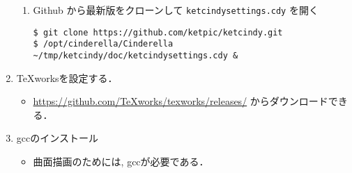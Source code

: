 \documentclass{ujarticle}
\begin{document}
\begin{enumerate}[\bf\large 1.]
\begin{enumerate}[(1)]
\item Github から最新版をクローンして \verb|ketcindysettings.cdy| を開く
\begin{verbatim}
$ git clone https://github.com/ketpic/ketcindy.git
$ /opt/cinderella/Cinderella ~/tmp/ketcindy/doc/ketcindysettings.cdy &
\end{verbatim}

\end{enumerate}


\item TeXworksを設定する．
  \begin{itemize}
  \item \url{https://github.com/TeXworks/texworks/releases/} からダウンロードできる．
  \end{itemize}

\item gccのインストール
  \begin{itemize}
    \item 曲面描画のためには, gccが必要である．
  \end{itemize}
\end{enumerate}
\end{document}
